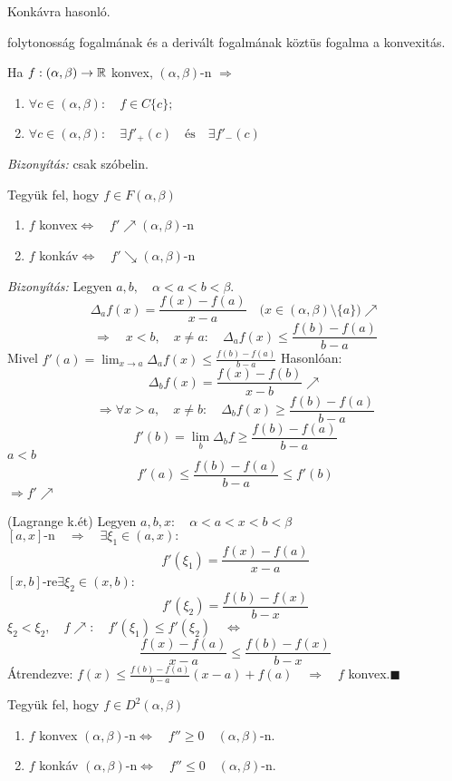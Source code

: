 \documentclass[a4paper,11.5pt]{article}
\begin{document}
	\begin{note}
		Konkávra hasonló.
	\end{note}
	\begin{note}
		folytonosság fogalmának és a derivált fogalmának köztüs fogalma a konvexitás.
	\end{note}
	\begin{theorem}
		Ha $f:(\alpha,\beta)\to\mathbb{R}$ konvex, $(\alpha,\beta)$-n $\Rightarrow$
		\begin{enumerate}
			\item $\forall c\in(\alpha,\beta):\quad f\in C\{c\};$
			\item $\forall c\in(\alpha,\beta):\quad \exists f'_+(c)\quad \text{és}\quad \exists f'_-(c)$
		\end{enumerate}
		\textit{Bizonyítás:} csak szóbelin.
	\end{theorem}
	\begin{theorem}
		Tegyük fel, hogy $f\in F(\alpha,\beta)$
		\begin{enumerate}
			\item $f$ konvex\quad $\Leftrightarrow\quad f'\nearrow(\alpha,\beta)$-n
			\item $f$ konkáv\quad $\Leftrightarrow\quad f'\searrow(\alpha,\beta)$-n
		\end{enumerate}
		\textit{Bizonyítás:} \fbox{$\Rightarrow$} Legyen $a,b,\quad \alpha<a<b<\beta$.
		\[ \varDelta_af(x)=\frac{f(x)-f(a)}{x-a}\quad \big(x\in(\alpha,\beta)\setminus\{a\}\big)\nearrow \]
		\[ \Rightarrow\quad x<b,\quad x\not=a:\quad \varDelta_af(x)\leq\frac{f(b)-f(a)}{b-a} \]
		Mivel $f'(a)=\lim_{x\to a}\varDelta_af(x)\leq\frac{f(b)-f(a)}{b-a}$
		Hasonlóan:
		\[ \varDelta_bf(x)=\frac{f(x)-f(b)}{x-b}\nearrow \]
		\[ \Rightarrow \forall x>a,\quad x\not=b:\quad \varDelta_bf(x)\geq\frac{f(b)-f(a)}{b-a} \]
		\[ f'(b)=\lim_b\varDelta_bf\geq\frac{f(b)-f(a)}{b-a} \]
		$a<b$
		\[ f'(a)\leq\frac{f(b)-f(a)}{b-a}\leq f'(b) \]
		$\Rightarrow f'\nearrow$
		
		\fbox{$\Leftarrow$} (Lagrange k.ét)
		Legyen $a,b,x:\quad \alpha<a<x<b<\beta$
		$[a,x]\text{-n}\quad \Rightarrow\quad \exists\xi_1\in(a,x):$
		\[ f'(\xi_1)=\frac{f(x)-f(a)}{x-a} \]
		$[x,b]$-re\quad $\exists\xi_2\in(x,b):$
		\[ f'(\xi_2)=\frac{f(b)-f(x)}{b-x} \]
		$\xi_2<\xi_2,\quad f\nearrow:\quad f'(\xi_1)\leq f'(\xi_2)\quad \Leftrightarrow$
		\[ \frac{f(x)-f(a)}{x-a}\leq\frac{f(b)-f(x)}{b-x} \]
		Átrendezve: $f(x)\leq\frac{f(b)-f(a)}{b-a}(x-a)+f(a)\quad \Rightarrow\quad f$ konvex.\quad $ \blacksquare$
	\end{theorem}
	\begin{theorem}
		Tegyük fel, hogy $f\in D^2(\alpha,\beta)$
		\begin{enumerate}
			\item $f$ konvex $(\alpha,\beta)$-n\quad $\Leftrightarrow \quad f''\geq 0 \quad (\alpha,\beta)$-n.
			\item $f$ konkáv $(\alpha,\beta)$-n\quad $\Leftrightarrow \quad f''\leq 0 \quad (\alpha,\beta)$-n.
		\end{enumerate}
	\end{theorem}
\end{document}
